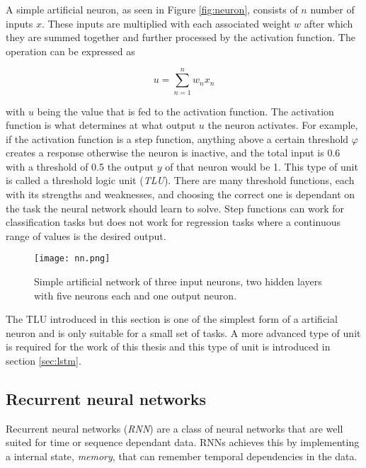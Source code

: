 \documentclass[../main.tex]{subfiles}
\begin{document}
A simple artificial neuron, as seen in Figure \ref{fig:neuron}, consists of $n$ number of inputs $x$. These inputs are multiplied with each associated weight $w$ after which they are summed together and further processed by the activation function. The operation can be expressed as

$$u = \sum_{n=1}^{n}w_n x_n$$

with $u$ being the value that is fed to the activation function. The activation function is what determines at what output $u$ the neuron activates. For example, if the activation function is a step function, anything above a certain threshold $\varphi$ creates a response otherwise the neuron is inactive, and the total input is 0.6 with a threshold of 0.5 the output $y$ of that neuron would be 1. This type of unit is called a threshold logic unit (\textit{TLU}). There are many threshold functions, each with its strengths and weaknesses, and choosing the correct one is dependant on the task the neural network should learn to solve. Step functions can work for classification tasks but does not work for regression tasks where a continuous range of values is the desired output.

\begin{figure}[H]
\centering
\texttt{[image: nn.png]}
\caption{Simple artificial network of three input neurons, two hidden layers with five neurons each and one output neuron.}
\label{fig:network}
\end{figure}

The TLU introduced in this section is one of the simplest form of a artificial neuron and is only suitable for a small set of tasks. A more advanced type of unit is required for the work of this thesis and this type of unit is introduced in section \ref{sec:lstm}.

\subsection{Recurrent neural networks}

Recurrent neural networks (\textit{RNN}) are a class of neural networks that are well suited for time or sequence dependant data. RNNs achieves this by implementing a internal state, \textit{memory}, that can remember temporal dependencies in the data.
\end{document}
